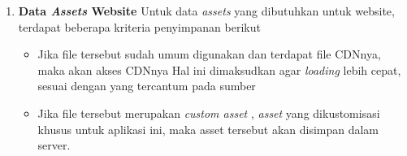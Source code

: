 \begin{enumerate}
    \item \textbf{Data \textit{Assets} Website}
    \newline
    Untuk data \textit{assets} yang dibutuhkan untuk website, terdapat beberapa kriteria penyimpanan berikut
    
      \begin{itemize}[noitemsep,topsep=0pt]
      \item Jika file tersebut sudah umum digunakan dan terdapat file CDNnya, maka akan akses CDNnya
      \newline
      Hal ini dimaksudkan agar \textit{loading} lebih cepat, sesuai dengan yang tercantum pada sumber \cite{sitepoint_7_2011}
      \item Jika file tersebut merupakan \textit{custom asset} , \textit{asset} yang dikustomisasi khusus untuk aplikasi ini, maka asset tersebut akan disimpan dalam server.
      \end{itemize}
    
    \end{enumerate}